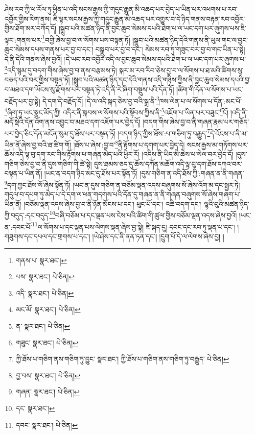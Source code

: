 ཤེས་རབ་ཀྱི་ཕ་རོལ་ཏུ་ཕྱིན་པ་འདི་སངས་རྒྱས་ཀྱི་གདུང་རྒྱུན་མི་འཆད་པར་བྱེད་པ་ཡིན་པར་འཕགས་པ་རབ་འབྱོར་གྱིས་རིག་ནས། ཇི་ལྟར་སངས་རྒྱས་ཀྱི་གདུང་རྒྱུན་མི་འཆད་པར་འགྱུར་བ་དེ་ཉིད་གནས་བརྟན་རབ་འབྱོར་གྱིས་ཐོག་མར་བཀོད་དོ། །སྒྲུབ་པའི་མཚན་ཉིད་ནི་བྱང་ཆུབ་སེམས་དཔའི་ཐེག་པ་ལ་ཡང་དག་པར་ཞུགས་པས་ཇི་ལྟར་:གནས་པར་\footnote{གནས་པ་  སྣར་ཐང་། }བགྱི་ཞེས་བྱ་བ་ལ་སོགས་པས་བསྟན་ཏོ། །སྒྲུབ་པའི་མཚན་ཉིད་དེའི་གནས་ནི་ཡུལ་གང་ལ་བྱང་ཆུབ་སེམས་དཔས་གནས་པར་བྱ་བ་དང་། བསྒྲུབ་པར་བྱ་བ་དང་། སེམས་རབ་ཏུ་གཟུང་བར་བྱ་བ་གང་ཡིན་པ་སྟེ། དེ་ནི་དེའི་གནས་ཞེས་བྱའོ། །དེ་ཡང་རབ་འབྱོར་འདི་ལ་བྱང་ཆུབ་སེམས་དཔའི་ཐེག་པ་ལ་ཡང་དག་པར་ཞུགས་པ་\footnote{པས་  སྣར་ཐང་།  པེ་ཅིན། }འདི་སྙམ་དུ་བདག་གིས་ཞེས་བྱ་བ་ནས་བརྩམས་ཏེ། སྐར་མ་རབ་རིབ་ཅེས་བྱ་བ་ལ་སོགས་པ་ཐ་མའི་ཚིགས་སུ་བཅད་པའི་བར་གྱིས་བསྟན་ཏོ། །སྒྲུབ་པའི་མཚན་ཉིད་དང་དེའི་གནས་འདི་གཉིས་ཀྱིས་ནི་བྱང་ཆུབ་སེམས་དཔའི་བྱ་བ་མཐའ་དག་ཡོངས་སུ་རྫོགས་པར་བསྟན་ཏེ་འདི་ནི་རེ་ཞིག་བསྡུས་པའི་དོན་ཏོ། །ཚིག་གི་དོན་ལ་སོགས་པ་ཡང་བརྗོད་པར་བྱ་སྟེ། དེ་དག་དེ་བརྗོད་དོ། །དེ་ལ་འདི་སྐད་ཅེས་བྱ་བའི་སྒྲ་ནི་\footnote{འདི་  སྣར་ཐང་།  པེ་ཅིན། }ཁས་ལེན་པ་ལ་སོགས་པ་དོན་:མང་པོ་\footnote{མང་མོ་  སྣར་ཐང་།  པེ་ཅིན། }ཞིག་ཏུ་ཡང་སྣང་མོད་ཀྱི། འདིར་ནི་སྐབས་ལ་སོགས་པའི་སྟོབས་ཀྱིས་ནི་\footnote{ན་  སྣར་ཐང་།  པེ་ཅིན། }འཇོག་པ་ཡིན་པར་བཟུང་\footnote{གཟུང་  སྣར་ཐང་།  པེ་ཅིན། }ངོ། །འདི་ནི་མདོ་སྡེའི་དོན་འོག་ནས་འབྱུང་བ་མཐའ་དག་འཇོག་པར་བྱེད་དོ། །བདག་གིས་ཞེས་བྱ་བ་ནི་གཞན་རྣམ་པར་གཅོད་པར་བྱེད་ཅིང་དོན་མངོན་སུམ་དུ་ཐོས་པར་བསྟན་ཏོ། །བདག་ཉིད་ཀྱིས་ཐོས་:པ་གཅིག་ཏུ་བརྒྱུད་\footnote{ཀྱི་ཐོས་པ་གཅིག་ནས་གཅིག་ཏུ་བྱུང་  སྣར་ཐང་། ཀྱི་ཐོས་པ་གཅིག་ནས་གཅིག་ཏུ་བརྒྱུད་  པེ་ཅིན། }དེ་འོངས་པ་ནི་མ་ཡིན་ནོ་ཞེས་བྱ་བའི་ཐ་ཚིག་གོ། །ཐོས་པ་ཞེས་:བྱ་བ་\footnote{བྱ་བས་  སྣར་ཐང་།  པེ་ཅིན། }ནི་རྟོགས་པ་དགག་པར་བྱེད་དེ། སངས་རྒྱས་མ་གཏོགས་པར་ཆོས་འདི་ལྟ་བུ་དག་རང་གིས་རྟོགས་པ་གཞན་མེད་པའི་ཕྱིར་རོ། །འདིས་ནི་ཡིད་མི་ཆེས་པ་སེལ་བར་བྱེད་དོ། །དུས་གཅིག་ཅེས་བྱ་བ་ནི་དུས་གཅིག་གི་ཚེ་སྟེ། དུས་ཐམས་ཅད་དུ་ཆོས་དཀོན་མཆོག་འདི་ལྟ་བུ་དག་ཐོས་དཀའ་བར་བསྟན་པ་ཡིན་ནོ། །ཡང་ན་བདག་ཉིད་མང་དུ་ཐོས་པར་སྟོན་ཏོ། །དུས་གཅིག་ན་འདི་ཐོས་ཀྱི་:གཞན་ན་ནི་གཞན་\footnote{གཞན་  སྣར་ཐང་།  པེ་ཅིན། }དག་ཀྱང་ཐོས་སོ་ཞེས་སྟོན་ཏོ། །ཡང་ན་དུས་གཅིག་ན་བཅོམ་ལྡན་འདས་བཞུགས་སོ་ཞེས་འོག་མ་དང་སྦྱར་ཏེ། གདུལ་བ་དཔག་ཏུ་མེད་པ་དེ་དག་ལ་ཕན་གདགས་པའི་དོན་དུ་གཞན་ན་ནི་གཞན་བཞུགས་སོ་ཞེས་གཞག་པ་ཡིན་ནོ། །བཅོམ་ལྡན་འདས་ཞེས་བྱ་བ་ནི་ཉོན་མོངས་པ་དང་། ཕུང་པོ་དང་། འཆི་བདག་དང་། ལྷའི་བུའི་མཚན་ཉིད་ཀྱི་བདུད་:དང་བདུད་\footnote{དང་  སྣར་ཐང་། }བཞི་བཅོམ་པ་དང་ལྡན་པས་ངེས་པའི་ཚིག་གི་ཚུལ་གྱིས་བཅོམ་ལྡན་འདས་ཞེས་བྱའོ། །ཡང་ན་:དབང་པོ་\footnote{དབང་  སྣར་ཐང་།  པེ་ཅིན། }ལ་སོགས་པ་དང་ལྡན་པས་ལེགས་ལྡན་ཞེས་བྱ་སྟེ། ཇི་སྐད་དུ། དབང་དང་རབ་ཏུ་ལྡན་པ་དང་། །གཟུགས་དང་དཔལ་དང་གྲགས་པ་དང་། །ཡེ་ཤེས་དང་ནི་ནན་ཏན་དང་། །དྲུག་པོ་དེ་ལ་ལེགས་ཞེས་བྱ། །
